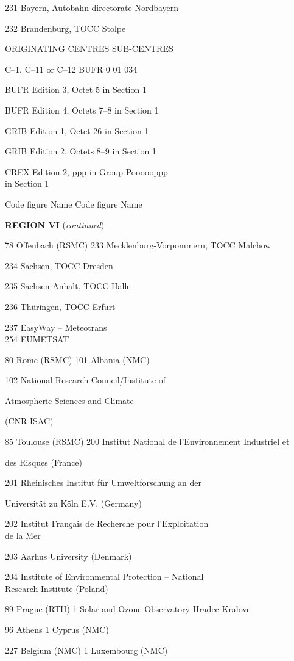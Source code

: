 231 Bayern, Autobahn directorate Nordbayern

232 Brandenburg, TOCC Stolpe

ORIGINATING CENTRES SUB-CENTRES

C--1, C--11 or C--12 BUFR 0 01 034

BUFR Edition 3, Octet 5 in Section 1

BUFR Edition 4, Octets 7--8 in Section 1

GRIB Edition 1, Octet 26 in Section 1

GRIB Edition 2, Octets 8--9 in Section 1

CREX Edition 2, ppp in Group Poooooppp\\
in Section 1

Code figure Name Code figure Name

\textbf{REGION VI} (\emph{continued})

78 Offenbach (RSMC) 233 Mecklenburg-Vorpommern, TOCC Malchow

234 Sachsen, TOCC Dresden

235 Sachsen-Anhalt, TOCC Halle

236 Thüringen, TOCC Erfurt

237 EasyWay -- Meteotrans\\
254 EUMETSAT

80 Rome (RSMC) 101 Albania (NMC)

102 National Research Council/Institute of

Atmospheric Sciences and Climate

(CNR-ISAC)

85 Toulouse (RSMC) 200 Institut National de l'Environnement Industriel et

des Risques (France)

201 Rheinisches Institut für Umweltforschung an der

Universität zu Köln E.V. (Germany)

202 Institut Français de Recherche pour l'Exploitation\\
de la Mer

203 Aarhus University (Denmark)

204 Institute of Environmental Protection -- National\\
Research Institute (Poland)

89 Prague (RTH) 1 Solar and Ozone Observatory Hradec Kralove

96 Athens 1 Cyprus (NMC)

227 Belgium (NMC) 1 Luxembourg (NMC)

